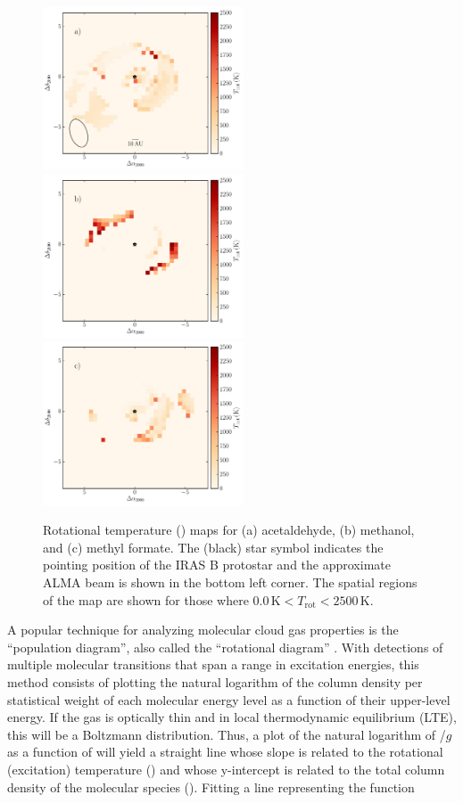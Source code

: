 \documentclass[iop,twocolappendix]{emulateapj}
\begin{document}
\begin{figure}[t]
\begin{center}
\includegraphics[width=5.95cm]{Acetaldehyde_Tmap.pdf} \includegraphics[width=5.95cm]{Methanol_Tmap.pdf} \includegraphics[width=5.95cm]{MethylFormate_Tmap.pdf}
\caption{Rotational temperature (\Trot) maps for (a) acetaldehyde, (b) methanol, and (c) methyl formate. The (black) star symbol indicates the pointing position of the IRAS B protostar and the approximate ALMA beam is shown in the bottom left corner. The spatial regions of the map are shown for those where $0.0 \, \mathrm{K} < T_\mathrm{rot} < 2500 \, \mathrm{K}$.}
\label{fig:Tmaps}
\end{center}
\end{figure}

A popular technique for analyzing molecular cloud gas properties is the ``population diagram'', also called the ``rotational diagram'' \citep[e.g.,][]{Bisschop2008}. With detections of multiple molecular transitions that span a range in excitation energies, this method consists of plotting the natural logarithm of the column density per statistical weight of each molecular energy level as a function of their upper-level energy. If the gas is optically thin and in local thermodynamic equilibrium (LTE), this will be a Boltzmann distribution. Thus, a plot of the natural logarithm of {\Nthin}/$g$ as a function of {\Eul} will yield a straight line whose slope is related to the rotational (excitation) temperature (\Trot) and whose y-intercept is related to the total column density of the molecular species ({\Ntot}). Fitting a line representing the function
\end{document}
